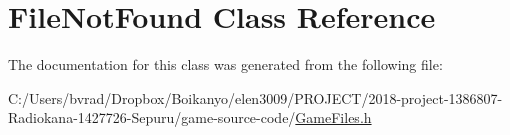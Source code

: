 \hypertarget{class_file_not_found}{}\section{File\+Not\+Found Class Reference}
\label{class_file_not_found}


The documentation for this class was generated from the following file\+:\begin{DoxyCompactItemize}
\item 
C\+:/\+Users/bvrad/\+Dropbox/\+Boikanyo/elen3009/\+P\+R\+O\+J\+E\+C\+T/2018-\/project-\/1386807-\/\+Radiokana-\/1427726-\/\+Sepuru/game-\/source-\/code/\mbox{\hyperlink{_game_files_8h}{Game\+Files.\+h}}\end{DoxyCompactItemize}
